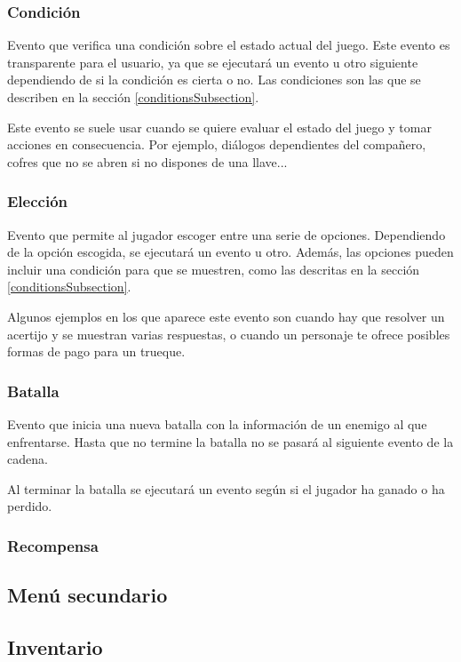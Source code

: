 \subsubsection{Condición}
Evento que verifica una condición sobre el estado actual del juego. Este evento es transparente para el usuario, ya que se ejecutará un evento u otro siguiente dependiendo de si la condición es cierta o no. Las condiciones son las que se describen en la sección \ref{conditionsSubsection}.

Este evento se suele usar cuando se quiere evaluar el estado del juego y tomar acciones en consecuencia. Por ejemplo, diálogos dependientes del compañero, cofres que no se abren si no dispones de una llave...

\subsubsection{Elección}
Evento que permite al jugador escoger entre una serie de opciones. Dependiendo de la opción escogida, se ejecutará un evento u otro. Además, las opciones pueden incluir una condición para que se muestren, como las descritas en la sección \ref{conditionsSubsection}.

Algunos ejemplos en los que aparece este evento son cuando hay que resolver un acertijo y se muestran varias respuestas, o cuando un personaje te ofrece posibles formas de pago para un trueque.

\subsubsection{Batalla} \label{battleDesignSubsection}
Evento que inicia una nueva batalla con la información de un enemigo al que enfrentarse.
Hasta que no termine la batalla no se pasará al siguiente evento de la cadena.

Al terminar la batalla se ejecutará un evento según si el jugador ha ganado o ha perdido.

\subsubsection{Recompensa}

\subsection{Menú secundario}

\subsection{Inventario}

